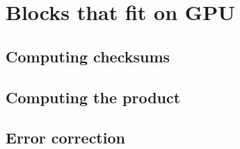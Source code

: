 \section{Blocks that fit on GPU}
\subsection{Computing checksums}
\subsection{Computing the product}
\subsection{Error correction}
